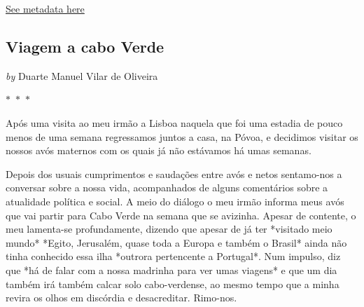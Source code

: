 
\hyperref[table:\arabic{tablecounter}]{See metadata here}

\newpage

\begin{center}

    \section{  Viagem a cabo Verde  }

    
            
                \textit{by} Duarte Manuel Vilar de Oliveira
            
        

     
    
    

$\ast$~$\ast$~$\ast$



\end{center}

\begin{center}
    \begin{minipage}{0.9\textwidth}
        \setlength{\parskip}{0.2cm}
        \setlength{\parindent}{0cm}
        \fontsize{12pt}{14pt}\selectfont
        


Após uma visita ao meu irmão a Lisboa naquela que foi uma estadia de
pouco menos de uma semana regressamos juntos a casa, na Póvoa, e
decidimos visitar os nossos avós maternos com os quais já não estávamos
há umas semanas.

Depois dos usuais cumprimentos e saudações entre avós e netos
sentamo-nos a conversar sobre a nossa vida, acompanhados de alguns
comentários sobre a atualidade política e social. A meio do diálogo o
meu irmão informa meus avós que vai partir para Cabo Verde na semana que
se avizinha. Apesar de contente, o meu lamenta-se profundamente, dizendo
que apesar de já ter *visitado meio mundo* *Egito, Jerusalém, quase toda
a Europa e também o Brasil* ainda não tinha conhecido essa ilha *outrora
pertencente a Portugal*. Num impulso, diz que *há de falar com a nossa
madrinha para ver umas viagens* e que um dia também irá também calcar
solo cabo-verdense, ao mesmo tempo que a minha revira os olhos em
discórdia e desacreditar. Rimo-nos.

    \end{minipage}
\end{center}


